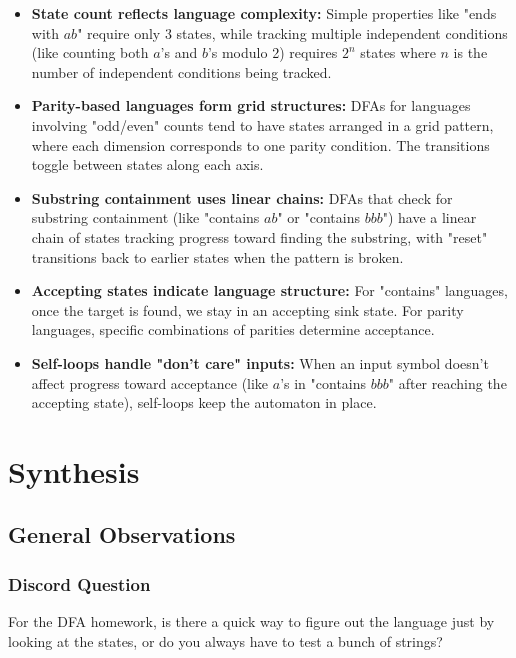 \documentclass{article}
\theoremstyle{theorem}
\theoremstyle{definition}
\theoremstyle{remark}
\begin{document}
\begin{itemize}
  \item \textbf{State count reflects language complexity:} Simple properties like "ends with $ab$" require only 3 states, while tracking multiple independent conditions (like counting both $a$'s and $b$'s modulo 2) requires $2^n$ states where $n$ is the number of independent conditions being tracked.
  
  \item \textbf{Parity-based languages form grid structures:} DFAs for languages involving "odd/even" counts tend to have states arranged in a grid pattern, where each dimension corresponds to one parity condition. The transitions toggle between states along each axis.
  
  \item \textbf{Substring containment uses linear chains:} DFAs that check for substring containment (like "contains $ab$" or "contains $bbb$") have a linear chain of states tracking progress toward finding the substring, with "reset" transitions back to earlier states when the pattern is broken.
  
  \item \textbf{Accepting states indicate language structure:} For "contains" languages, once the target is found, we stay in an accepting sink state. For parity languages, specific combinations of parities determine acceptance.
  
  \item \textbf{Self-loops handle "don't care" inputs:} When an input symbol doesn't affect progress toward acceptance (like $a$'s in "contains $bbb$" after reaching the accepting state), self-loops keep the automaton in place.
\end{itemize}

\section{Synthesis}

\subsection{General Observations}

\subsubsection{Discord Question}

For the DFA homework, is there a quick way to figure out the language just by looking at the states, or do you always have to test a bunch of strings?
\end{document}
